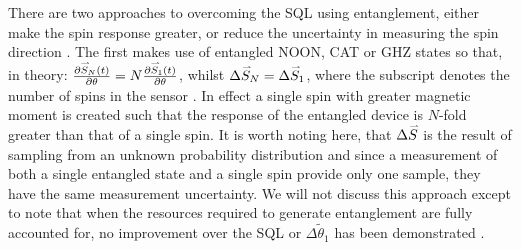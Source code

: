 \documentclass[reqno]{amsart}
\def\est#1{\tilde{#1}}
\newcommand{\myvec}[1]{\accentset{\rightharpoonup}{#1}}
\begin{document}
There are two approaches to overcoming the SQL using entanglement, either make the spin response greater, or reduce the uncertainty in measuring the spin direction \cite{Gross2012, Ma2011, Ludlow2015, Pezze2018}. The first makes use of entangled NOON, CAT or GHZ states so that, in theory: $\frac{\partial \myvec{S}_N(t)}{\partial \theta} = N \frac{\partial \myvec{S}_1(t)}{\partial \theta}$, whilst $\Delta \myvec{S}_N = \Delta \myvec{S}_1$, where the subscript denotes the number of spins in the sensor \cite{Pezze2018, Gross2012, Ludlow2015, Bollinger1996, Dowling1998, Childs2000, Campos2003, Kok2004, Leibfried2004, Nagata2007, Resch2007, Berry2009, Dorner2009, Escher2011, Giovannetti2011, Daryanoosh2018, Shaniv2018, Xie2021}. In effect a single spin with greater magnetic moment is created such that the response of the entangled device is $N$-fold greater than that of a single spin. It is worth noting here, that $\Delta \myvec{S}$ is the result of sampling from an unknown probability distribution and since a measurement of both a single entangled state and a single spin provide only one sample, they have the same measurement uncertainty. We will not discuss this approach except to note that when the resources required to generate entanglement are fully accounted for, no improvement over the SQL or $\Delta \est{\theta}_1$ has been demonstrated \cite{McGuinness2021}.
\end{document}
